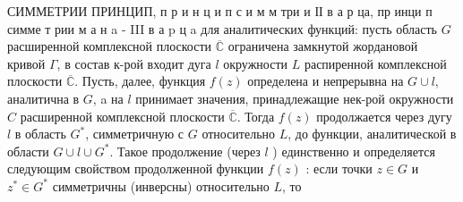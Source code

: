 \documentclass[10pt]{article}
\begin{document}
СИММЕТРИИ ПРИНЦИП, п р и н ц и п с и м м три и ІІ в а $р$ ца, пр инци п симме т рии м а н a - III в а p ц a для аналитических функций: пусть область $G$ расширенной комплексной плоскости $\overline{\mathbb{C}}$ ограничена замкнутой жордановой кривой $\Gamma$, в состав к-рой входит дуга $l$ окружности $L$ распиренной комплексной плоскости $\overline{\mathbb{C}}$. Пусть, далее, функция $f(z)$ определена и непрерывна на $G \cup l$, аналитична в $G$, a на $l$ принимает значения, принадлежащие нек-рой окружности $C$ расширенной комплексной плоскости $\overline{\mathbb{C}}$. Тогда $f(z)$ продолжается через дугу $l$ в область $G^{*}$, симметричную с $G$ относительно $L$, до функции, аналитической в области $G \cup l \cup G^{*}$. Такое продолжение (через $l$ ) единственно и определяется следующим свойством продолженной функции $f(z)$ : если точки $z \in G$ и $z^{*} \in G^{*}$ симметричны (инверсны) относительно $L$, то
\end{document}

